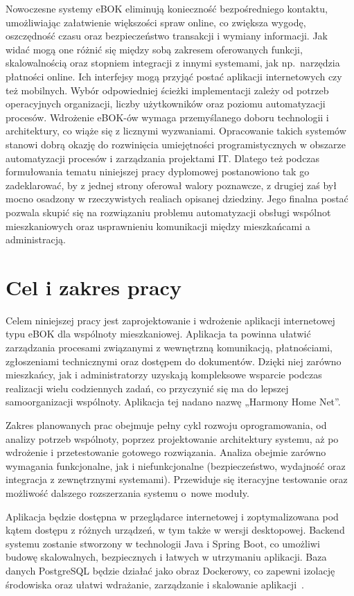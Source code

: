 Nowoczesne systemy eBOK eliminują konieczność bezpośredniego kontaktu, umożliwiając załatwienie większości spraw online, co zwiększa wygodę, oszczędność czasu oraz bezpieczeństwo transakcji i wymiany informacji. Jak widać mogą one różnić się między sobą zakresem oferowanych funkcji, skalowalnością oraz stopniem integracji z innymi systemami, jak np.\ narzędzia płatności online. Ich interfejsy mogą przyjąć postać aplikacji internetowych czy też mobilnych. Wybór odpowiedniej ścieżki implementacji zależy od potrzeb operacyjnych organizacji, liczby użytkowników oraz poziomu automatyzacji procesów. Wdrożenie eBOK-ów wymaga przemyślanego doboru technologii i architektury, co wiąże się z licznymi wyzwaniami. Opracowanie takich systemów stanowi dobrą okazję do rozwinięcia umiejętności programistycznych w obszarze automatyzacji procesów i zarządzania projektami IT. Dlatego też podczas formułowania tematu niniejszej pracy dyplomowej postanowiono tak go zadeklarować, by z jednej strony oferował walory poznawcze, z drugiej zaś był mocno osadzony w rzeczywistych realiach opisanej dziedziny. Jego finalna postać pozwala skupić się na rozwiązaniu problemu automatyzacji obsługi wspólnot mieszkaniowych oraz usprawnieniu komunikacji między mieszkańcami a administracją.

\section{Cel i zakres pracy}
Celem niniejszej pracy jest zaprojektowanie i wdrożenie aplikacji internetowej typu eBOK dla wspólnoty mieszkaniowej. Aplikacja ta powinna ułatwić zarządzania procesami związanymi z wewnętrzną komunikacją, płatnościami, zgłoszeniami technicznymi oraz dostępem do dokumentów. Dzięki niej zarówno mieszkańcy, jak i administratorzy uzyskają kompleksowe wsparcie podczas realizacji wielu codziennych zadań, co przyczynić się ma do lepszej samoorganizacji wspólnoty. Aplikacja tej nadano nazwę „Harmony Home Net”.

Zakres planowanych prac obejmuje pełny cykl rozwoju oprogramowania, od analizy potrzeb wspólnoty, poprzez projektowanie architektury systemu, aż po wdrożenie i przetestowanie gotowego rozwiązania. Analiza obejmie zarówno wymagania funkcjonalne, jak i niefunkcjonalne (bezpieczeństwo, wydajność oraz integracja z zewnętrznymi systemami). Przewiduje się iteracyjne testowanie oraz możliwość dalszego rozszerzania systemu o~nowe moduły.

Aplikacja będzie dostępna w przeglądarce internetowej i zoptymalizowana pod kątem dostępu z różnych urządzeń, w tym także w wersji desktopowej. Backend systemu zostanie stworzony w technologii Java i Spring Boot, co umożliwi budowę skalowalnych, bezpiecznych i łatwych w utrzymaniu aplikacji. Baza danych PostgreSQL będzie działać jako obraz Dockerowy, co zapewni izolację środowiska oraz ułatwi wdrażanie, zarządzanie i skalowanie aplikacji~\cite{EARTHLY}.

